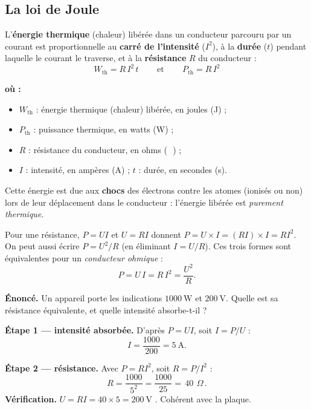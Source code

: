 \documentclass[11pt,a4paper]{article}
\newenvironment{ou}{%
  \par\smallskip\noindent\textbf{où :}\nopagebreak
  \begin{itemize}[leftmargin=1.8em,topsep=2pt,itemsep=1.5pt,parsep=0pt]}%
  {\end{itemize}}
\newcommand{\ohm}{\,\Omega}
\begin{document}
\subsection{La loi de Joule}

\begin{theoreme}
L'\textbf{énergie thermique} (chaleur) libérée dans un conducteur parcouru par un courant est
proportionnelle au \textbf{carré de l'intensité} ($I^2$), à la \textbf{durée} ($t$) pendant laquelle
le courant le traverse, et à la \textbf{résistance} $R$ du conducteur :
\[ \boxed{\,W_{\mathrm{th}} = R\,I^{2}\,t\,} \qquad\text{et}\qquad \boxed{\,P_{\mathrm{th}} = R\,I^{2}\,} \]
\begin{ou}
  \item $W_{\mathrm{th}}$ : énergie thermique (chaleur) libérée, en joules (\si{\joule}) ;
  \item $P_{\mathrm{th}}$ : puissance thermique, en watts (\si{\watt}) ;
  \item $R$ : résistance du conducteur, en ohms (\si{\ohm}) ;
  \item $I$ : intensité, en ampères (\si{\ampere}) ; $t$ : durée, en secondes (\si{\second}).
\end{ou}
Cette énergie est due aux \textbf{chocs} des électrons contre les atomes (ionisés ou non) lors de
leur déplacement dans le conducteur : l'énergie libérée est \emph{purement thermique}.
\end{theoreme}

\begin{remarque}
Pour une résistance, $P=UI$ et $U=RI$ donnent $P=U\times I = (RI)\times I = RI^2$. On peut aussi
écrire $P=U^2/R$ (en éliminant $I=U/R$). Ces trois formes sont équivalentes pour un \emph{conducteur
ohmique} :
\[ P = U\,I = R\,I^{2} = \dfrac{U^{2}}{R}. \]
\end{remarque}

\begin{exemple}
\textbf{Énoncé.} Un appareil porte les indications $\SI{1000}{\watt}$ et $\SI{200}{\volt}$. Quelle est
sa résistance équivalente, et quelle intensité absorbe-t-il ?

\smallskip
\textbf{Étape 1 — intensité absorbée.} D'après $P=UI$, soit $I=P/U$ :
\[ I = \frac{1000}{200} = \SI{5}{\ampere}. \]

\textbf{Étape 2 — résistance.} Avec $P=RI^2$, soit $R=P/I^2$ :
\[ R = \frac{1000}{5^2} = \frac{1000}{25} = \boxed{\,\SI{40}{\ohm}\,}. \]
\textbf{Vérification.} $U=RI = 40\times 5 = \SI{200}{\volt}$ \checkmark. \;Cohérent avec la plaque.
\end{exemple}
\end{document}
